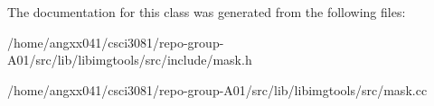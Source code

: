 The documentation for this class was generated from the following files\+:\begin{DoxyCompactItemize}
\item 
/home/angxx041/csci3081/repo-\/group-\/\+A01/src/lib/libimgtools/src/include/mask.\+h\item 
/home/angxx041/csci3081/repo-\/group-\/\+A01/src/lib/libimgtools/src/mask.\+cc\end{DoxyCompactItemize}
